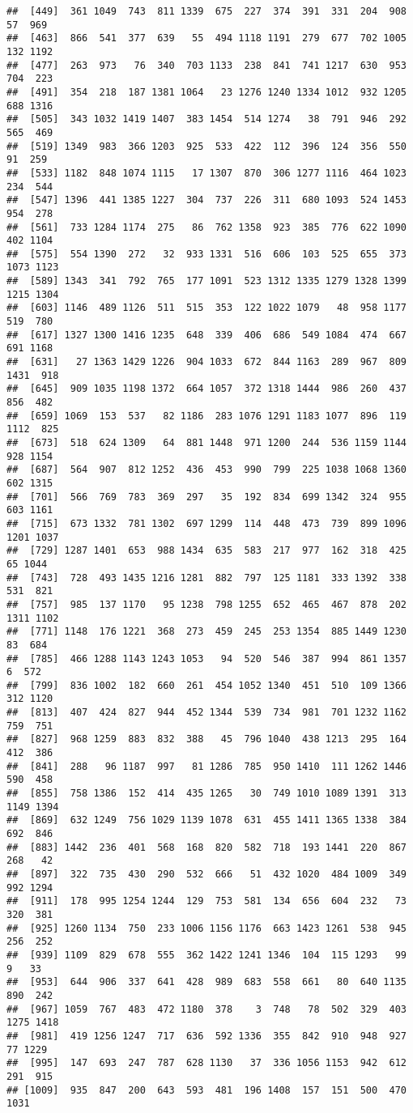 \documentclass[
]{article}
\begin{document}
\begin{verbatim}
##  [449]  361 1049  743  811 1339  675  227  374  391  331  204  908   57  969
##  [463]  866  541  377  639   55  494 1118 1191  279  677  702 1005  132 1192
##  [477]  263  973   76  340  703 1133  238  841  741 1217  630  953  704  223
##  [491]  354  218  187 1381 1064   23 1276 1240 1334 1012  932 1205  688 1316
##  [505]  343 1032 1419 1407  383 1454  514 1274   38  791  946  292  565  469
##  [519] 1349  983  366 1203  925  533  422  112  396  124  356  550   91  259
##  [533] 1182  848 1074 1115   17 1307  870  306 1277 1116  464 1023  234  544
##  [547] 1396  441 1385 1227  304  737  226  311  680 1093  524 1453  954  278
##  [561]  733 1284 1174  275   86  762 1358  923  385  776  622 1090  402 1104
##  [575]  554 1390  272   32  933 1331  516  606  103  525  655  373 1073 1123
##  [589] 1343  341  792  765  177 1091  523 1312 1335 1279 1328 1399 1215 1304
##  [603] 1146  489 1126  511  515  353  122 1022 1079   48  958 1177  519  780
##  [617] 1327 1300 1416 1235  648  339  406  686  549 1084  474  667  691 1168
##  [631]   27 1363 1429 1226  904 1033  672  844 1163  289  967  809 1431  918
##  [645]  909 1035 1198 1372  664 1057  372 1318 1444  986  260  437  856  482
##  [659] 1069  153  537   82 1186  283 1076 1291 1183 1077  896  119 1112  825
##  [673]  518  624 1309   64  881 1448  971 1200  244  536 1159 1144  928 1154
##  [687]  564  907  812 1252  436  453  990  799  225 1038 1068 1360  602 1315
##  [701]  566  769  783  369  297   35  192  834  699 1342  324  955  603 1161
##  [715]  673 1332  781 1302  697 1299  114  448  473  739  899 1096 1201 1037
##  [729] 1287 1401  653  988 1434  635  583  217  977  162  318  425   65 1044
##  [743]  728  493 1435 1216 1281  882  797  125 1181  333 1392  338  531  821
##  [757]  985  137 1170   95 1238  798 1255  652  465  467  878  202 1311 1102
##  [771] 1148  176 1221  368  273  459  245  253 1354  885 1449 1230   83  684
##  [785]  466 1288 1143 1243 1053   94  520  546  387  994  861 1357    6  572
##  [799]  836 1002  182  660  261  454 1052 1340  451  510  109 1366  312 1120
##  [813]  407  424  827  944  452 1344  539  734  981  701 1232 1162  759  751
##  [827]  968 1259  883  832  388   45  796 1040  438 1213  295  164  412  386
##  [841]  288   96 1187  997   81 1286  785  950 1410  111 1262 1446  590  458
##  [855]  758 1386  152  414  435 1265   30  749 1010 1089 1391  313 1149 1394
##  [869]  632 1249  756 1029 1139 1078  631  455 1411 1365 1338  384  692  846
##  [883] 1442  236  401  568  168  820  582  718  193 1441  220  867  268   42
##  [897]  322  735  430  290  532  666   51  432 1020  484 1009  349  992 1294
##  [911]  178  995 1254 1244  129  753  581  134  656  604  232   73  320  381
##  [925] 1260 1134  750  233 1006 1156 1176  663 1423 1261  538  945  256  252
##  [939] 1109  829  678  555  362 1422 1241 1346  104  115 1293   99    9   33
##  [953]  644  906  337  641  428  989  683  558  661   80  640 1135  890  242
##  [967] 1059  767  483  472 1180  378    3  748   78  502  329  403 1275 1418
##  [981]  419 1256 1247  717  636  592 1336  355  842  910  948  927   77 1229
##  [995]  147  693  247  787  628 1130   37  336 1056 1153  942  612  291  915
## [1009]  935  847  200  643  593  481  196 1408  157  151  500  470 1031
\end{verbatim}
\end{document}
